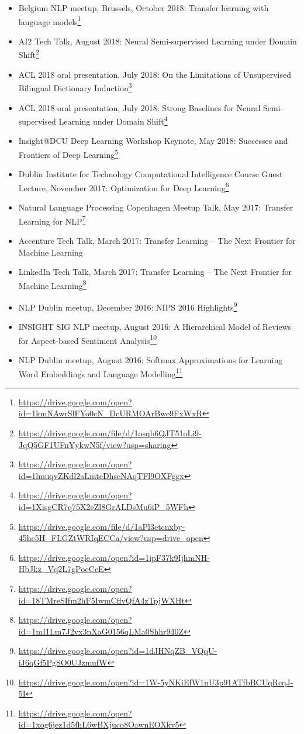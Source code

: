 \documentclass[10pt,letterpaper]{article}
\begin{document}
\begin{itemize}
	\parskip=0.1em
	
	\item Belgium NLP meetup, Brussels, October 2018: Transfer learning with language models\footnote{\url{https://drive.google.com/open?id=1kmNAwrSlFYo0cN_DcURMOArBwe9FxWxR}}
	
	\item AI2 Tech Talk, August 2018: Neural Semi-supervised Learning under Domain Shift\footnote{\url{https://drive.google.com/file/d/1osqb6QJT51oLi9-JqQ5GF1UFnYykwN5f/view?usp=sharing}}
	
	\item ACL 2018 oral presentation, July 2018: On the Limitations of Unsupervised Bilingual Dictionary Induction\footnote{\url{https://drive.google.com/open?id=1lmuqvZKdl2aLmtcDhscNAqTFl9OXFggx}}
	
	\item ACL 2018 oral presentation, July 2018: Strong Baselines for Neural Semi-supervised Learning under Domain Shift\footnote{\url{https://drive.google.com/open?id=1XisgCR7q75X2eZl8GrALDsMu6iP_5WFh}}
	
	\item Insight@DCU Deep Learning Workshop Keynote, May 2018: Successes and Frontiers of Deep Learning\footnote{\url{https://drive.google.com/file/d/1aPl3etcnxby-45hc5H_FLGZtWRIqECCa/view?usp=drive_open}}
	
	\item Dublin Institute for Technology Computational Intelligence Course Guest Lecture, November 2017: Optimization for Deep Learning\footnote{\url{https://drive.google.com/open?id=1ipF37k9IjhmNH-HbJkz_Vq2L7gPoeCcE}}
		
	\item Natural Language Processing Copenhagen Meetup Talk, May 2017: Transfer Learning for NLP\footnote{\url{https://drive.google.com/open?id=18TMreSIfm2hF5IwmCflvQfA4zTpjWXHt}}
	
	\item Accenture Tech Talk, March 2017: Transfer Learning -- The Next Frontier for Machine Learning
	
	\item LinkedIn Tech Talk, March 2017: Transfer Learning -- The Next Frontier for Machine Learning\footnote{\url{https://drive.google.com/open?id=1mI1Lm7J2vx3nXaG0156qLMa0Shhr940Z}}
	
	\item NLP Dublin meetup, December 2016: NIPS 2016 Highlights\footnote{\url{https://drive.google.com/open?id=1dJHNqZB_VQqU-iJ6qGf5PgSO0UJzmufW}}
	
	\item INSIGHT SIG NLP meetup, August 2016: A Hierarchical Model of Reviews for Aspect-based Sentiment Analysis\footnote{\url{https://drive.google.com/open?id=1W-5yNKiEfW1nU3p91ATfbBCUqRcqJ-5I}}
	
	\item NLP Dublin meetup, August 2016: Softmax Approximations for Learning Word Embeddings and Language Modelling\footnote{\url{https://drive.google.com/open?id=1xog6jez1d5fhL6wBXjuco8OawnEOXkv5}}
	
\end{itemize}
\end{document}
